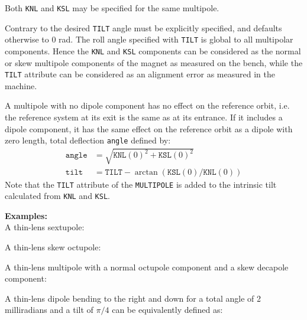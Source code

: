 Both \texttt{KNL} and \texttt{KSL} may be specified for the same multipole.

Contrary to \madeight the desired \texttt{TILT} angle must be explicitly
specified, and defaults otherwise to 0 rad. The roll angle specified
with \texttt{TILT} is global to all multipolar components.
Hence the \texttt{KNL} and \texttt{KSL} components can be considered as the
normal or skew multipole components of the magnet as measured on the
bench, while the \texttt{TILT} attribute can be considered as an alignment
error as measured in the machine.

A multipole with no dipole component has no effect on the reference
orbit, i.e. the reference system at its exit is the same as at its
entrance. If it includes a dipole component, it has the same effect on
the reference orbit as a dipole with zero length, total deflection
\texttt{angle} defined by: %
\begin{equation}
  \begin{aligned}
 \mathtt{angle} &=  \sqrt{ \mathtt{KNL}(0)^2 + \mathtt{KSL}(0)^2 }\\
 \mathtt{tilt}     &= \mathtt{TILT} - \arctan (\mathtt{KSL}(0) / \mathtt{KNL}(0))
  \end{aligned}
\end{equation}
Note that the \texttt{TILT} attribute of the \texttt{MULTIPOLE}
is added to the intrinsic tilt calculated from \texttt{KNL} and \texttt{KSL}.



\textbf{Examples:}\\
A thin-lens sextupole:

A thin-lens skew octupole:

A thin-lens multipole with a normal octupole component and a skew decapole
component:

A thin-lens dipole bending to the right and down for a total angle of
2 milliradians and a tilt of $\pi/4$ can be equivalently defined as:



